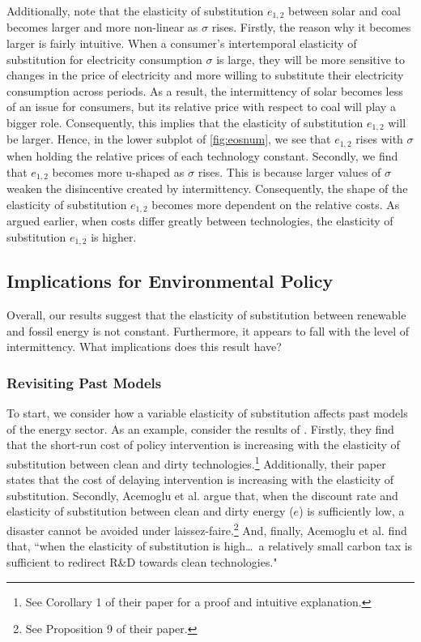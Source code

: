 \documentclass[11pt,a4paper,leqno]{extarticle}
\begin{document}
	Additionally, note that the elasticity of substitution $e_{1,2}$ between solar and coal becomes larger and more non-linear as $\sigma$ rises. Firstly, the reason why  it becomes larger is fairly intuitive. When a consumer's intertemporal elasticity of substitution for electricity consumption $\sigma$ is large, they will be more sensitive to changes in the price of electricity and more willing to substitute their electricity consumption across periods. As a result, the intermittency of solar becomes less of an  issue for consumers, but its relative price with respect to coal will play a bigger role. Consequently, this implies that the elasticity of substitution $e_{1, 2}$ will be larger. Hence, in the lower subplot of \autoref{fig:eosnum}, we see that $e_{1, 2}$ rises with $\sigma$ when holding the  relative prices of each technology constant. Secondly, we find that $e_{1,2}$ becomes more u-shaped as $\sigma$ rises. This is because larger values of $\sigma$ weaken the disincentive created by intermittency. Consequently, the shape of the elasticity of substitution $e_{1,2}$ becomes more dependent on the relative costs. As argued earlier, when costs differ greatly between technologies, the elasticity of substitution $e_{1,2}$ is higher.
	
	
	
	
	
	
	\subsection{Implications for Environmental Policy}
	
	Overall, our results suggest that the elasticity of substitution between  renewable and fossil energy is not constant. Furthermore, it appears to fall with the level of intermittency. What implications does this result have?
	
	\subsubsection{Revisiting Past Models}
	
	To start, we consider how  a variable elasticity of substitution affects past models of the energy sector. As an example, consider the results of \citet{Ace2012}. Firstly, they find that the short-run cost of policy intervention is increasing with the elasticity of substitution between clean and dirty technologies.\footnote{ See Corollary 1 of their paper for a proof and intuitive explanation.} Additionally, their paper states that the cost of delaying intervention is increasing with the elasticity of substitution. Secondly, Acemoglu et al. argue that, when the discount rate and elasticity of substitution between clean and dirty energy ($e$) is sufficiently low, a disaster cannot be avoided under laissez-faire.\footnote{ See Proposition 9 of their paper.} And, finally, Acemoglu et al. find that, ``when the elasticity of substitution is high\dots\, a relatively small carbon tax is sufficient to redirect R\&D towards clean technologies."
	
\end{document}
